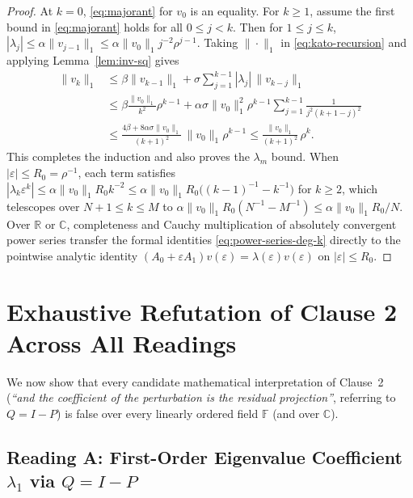 \documentclass[11pt,a4paper]{article}
\theoremstyle{definition}
\begin{document}
\begin{proof}
At $k = 0$, \eqref{eq:majorant} for $v_0$ is an equality. For $k \ge 1$, assume the first
bound in \eqref{eq:majorant} holds for all $0 \le j < k$. Then for $1 \le j \le k$,
$|\lambda_j| \le \alpha \|v_{j-1}\|_1 \le \alpha \|v_0\|_1 j^{-2} \rho^{j-1}$. Taking
$\|\cdot\|_1$ in \eqref{eq:kato-recursion} and applying Lemma~\ref{lem:inv-sq} gives
\begin{align*}
  \|v_k\|_1
  &\le \beta \|v_{k-1}\|_1 + \sigma \sum_{j=1}^{k-1} |\lambda_j|\, \|v_{k-j}\|_1 \\
  &\le \beta \frac{\|v_0\|_1}{k^2}\rho^{k-1}
     + \alpha\sigma\|v_0\|_1^2 \rho^{k-1}
       \sum_{j=1}^{k-1} \frac{1}{j^2 (k + 1 - j)^2} \\
  &\le \frac{4\beta + 8\alpha\sigma\|v_0\|_1}{(k + 1)^2}\,\|v_0\|_1 \rho^{k-1}
   \le \frac{\|v_0\|_1}{(k + 1)^2}\,\rho^k.
\end{align*}
This completes the induction and also proves the $\lambda_m$ bound. When
$|\varepsilon| \le R_0 = \rho^{-1}$, each term satisfies $|\lambda_k \varepsilon^k| \le
\alpha \|v_0\|_1 R_0 k^{-2} \le \alpha \|v_0\|_1 R_0 \bigl((k-1)^{-1} - k^{-1}\bigr)$
for $k \ge 2$, which telescopes over $N + 1 \le k \le M$ to
$\alpha \|v_0\|_1 R_0 (N^{-1} - M^{-1}) \le \alpha \|v_0\|_1 R_0 / N$. Over $\mathbb{R}$
or $\mathbb{C}$, completeness and Cauchy multiplication of absolutely convergent power
series transfer the formal identities \eqref{eq:power-series-deg-k} directly to the
pointwise analytic identity $(A_0 + \varepsilon A_1)v(\varepsilon) =
\lambda(\varepsilon)v(\varepsilon)$ on $|\varepsilon| \le R_0$.
\end{proof}

\section{Exhaustive Refutation of Clause 2 Across All Readings}

We now show that every candidate mathematical interpretation of Clause~2 (\emph{``and
the coefficient of the perturbation is the residual projection''}, referring to
$Q = I - P$) is false over every linearly ordered field $\mathbb{F}$ (and over
$\mathbb{C}$).

\subsection{Reading A: First-Order Eigenvalue Coefficient \texorpdfstring{$\lambda_1$}{lambda\_1} via \texorpdfstring{$Q = I - P$}{Q = I - P}}
\end{document}

